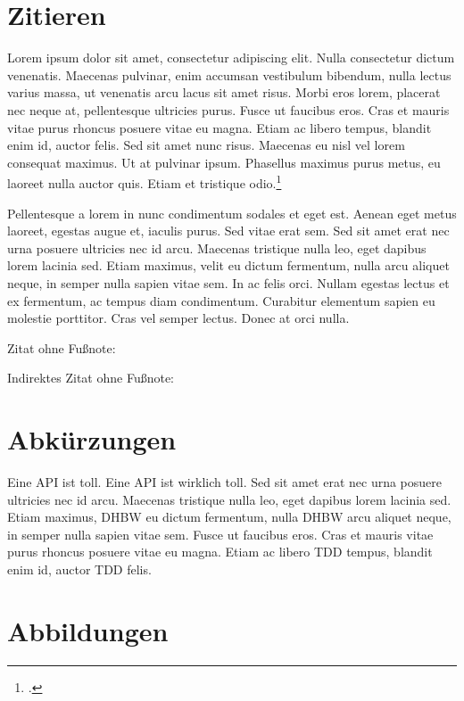 \documentclass[%
    auto-generate   = true,             %
    debug           = true,             %
    print-ndn       = true,             %
    print-loa       = true,             %
    print-lof       = true,             %
    print-lot       = true,             %
    print-lol       = true,             %
    bib-file        = literature.bib,   %
    plantuml        = true,             %
    title-style     = default,          %
    font-size       = 12pt              %
]{udhbwvst}
\begin{document}
\section{Zitieren}

Lorem ipsum dolor sit amet, consectetur adipiscing elit. Nulla consectetur dictum venenatis. Maecenas pulvinar, enim accumsan vestibulum bibendum, nulla lectus varius massa, ut venenatis arcu lacus sit amet risus. Morbi eros lorem, placerat nec neque at, pellentesque ultricies purus. Fusce ut faucibus eros. Cras et mauris vitae purus rhoncus posuere vitae eu magna. Etiam ac libero tempus, blandit enim id, auctor felis. Sed sit amet nunc risus. Maecenas eu nisl vel lorem consequat maximus. Ut at pulvinar ipsum. Phasellus maximus purus metus, eu laoreet nulla auctor quis. Etiam et tristique odio.\footcite[Vgl.][42]{iot_standard_war}

Pellentesque a lorem in nunc condimentum sodales et eget est. Aenean eget metus laoreet, egestas augue et, iaculis purus. Sed vitae erat sem.  Sed sit amet erat nec urna posuere ultricies nec id arcu. Maecenas tristique nulla leo, eget dapibus lorem lacinia sed. Etiam maximus, velit eu dictum fermentum, nulla arcu aliquet neque, in semper nulla sapien vitae sem. In ac felis orci. Nullam egestas lectus et ex fermentum, ac tempus diam condimentum. Curabitur elementum sapien eu molestie porttitor. Cras vel semper lectus. Donec at orci nulla.

Zitat ohne Fußnote: \cite[12]{zwave_alliance_vision}

Indirektes Zitat ohne Fußnote: 

\section{Abkürzungen}

Eine \ac{API} ist toll. Eine \ac{API} ist wirklich toll. Sed sit amet erat nec urna posuere ultricies nec id arcu. Maecenas tristique nulla leo, eget dapibus lorem lacinia sed. Etiam maximus, \ac{DHBW} eu dictum fermentum, nulla \ac{DHBW} arcu aliquet neque, in semper nulla sapien vitae sem. Fusce ut faucibus eros. Cras et mauris vitae purus rhoncus posuere vitae eu magna. Etiam ac libero \ac{TDD} tempus, blandit enim id, auctor \ac{TDD} felis.

\section{Abbildungen}
\end{document}
